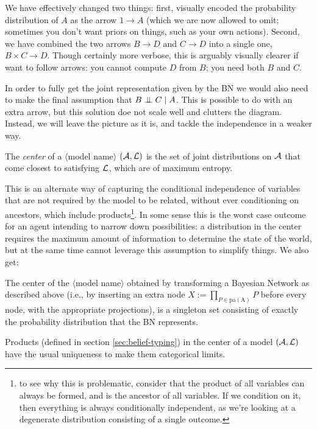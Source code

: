\documentclass{article}
\newcommand\modelname{{\color{green!50!black}$\langle$model name$\rangle$ }}
\begin{document}
	We have effectively changed two things: first, visually encoded the probability distribution of $A$ as the arrow $1 \to A$ (which we are now allowed to omit; sometimes you don't want priors on things, such as your own actions). Second, we have combined the two arrows $B \to D$ and $C \to D$ into a single one, $B \times C \to D$. Though certainly more verbose, this is arguably visually clearer if want to follow arrows: you cannot compute $D$ from $B$; you need both $B$ and $C$.
	
	In order to fully get the joint representation given by the BN we would also need to make the final assumption that $B \mathrel{\perp\mspace{-10mu}\perp} C \mid A$. This is possible to do with an extra arrow, but this solution doe not scale well and clutters the diagram. Instead, we will leave the picture as it is, and tackle the independence in a weaker way.
	
	\begin{defn}
		The \emph{center} of a \modelname $(\cal A, L)$ is the set of joint distributions on $\cal A$ that come closest to satisfying $\cal L$, which are of maximum entropy.
	\end{defn}

	This is an alternate way of capturing the conditional independence of variables that are not required by the model to be related, without ever conditioning on ancestors, which include products\footnote{to see why this is problematic, consider that the product of all variables can always be formed, and is the ancestor of all variables. If we condition on it, then everything is always conditionally independent, as we're looking at a degenerate distribution consisting of a single outcome.}. In some sense this is the worst case outcome for an agent intending to narrow down possibilities: a distribution in the center requires the maximum amount of information to determine the state of the world, but at the same time cannot leverage this assumption to simplify things. We also get:
	
	\begin{conj}
		The center of the \modelname obtained by transforming a Bayesian Network as described above (i.e., by inserting an extra node $X := \prod_{P \in \mathrm{pa(A)}} P$ before every node, with the appropriate projections), is a singleton set consisting of exactly the probability distribution that the BN represents.
	\end{conj}

	\begin{conj}
		Products (defined in section \ref{sec:belief-typing}) in the center of a model $(\cal A, L)$ have the usual uniqueness to make them categorical limits.
	\end{conj}
\end{document}
